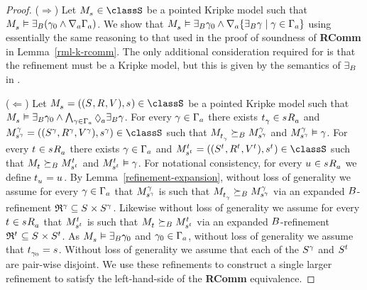 \begin{proof}
($\Rightarrow$)
Let $\kPModel{\kStateS} \in \classS$ be a pointed Kripke model such that $\kPModel{\kStateS} \entails \somerefsBs (\gamma_0 \land \coversA \Gamma_\agentA)$.
We show that $\kPModel{\kStateS} \entails \somerefsBs \gamma_0 \land \coversA \{\somerefsBs \gamma \mid \gamma \in \Gamma_\agentA\}$ using essentially the same reasoning to that used in the proof of soundness of {\bf RComm} in Lemma~\ref{rml-k-rcomm}.
The only additional consideration required for \logicRmlS{} is that the refinement must be a \classS{} Kripke model, but this is given by the semantics of $\somerefsBs$ in \logicRmlS{}.

($\Leftarrow$)
Let $\kPModelAndTuple{\kStateS} \in \classS$ be a pointed Kripke model such that $\kPModel{\kStateS} \entails \somerefsBs \gamma_0 \land \bigwedge_{\gamma \in \Gamma_\agentA} \possibleA \somerefsBs \gamma$.
For every $\gamma \in \Gamma_\agentA$ there exists $\kStateT_\gamma \in \kSuccessorsA{\kStateS}$ and $\kPModelAndTuple[\gamma]{\kStateS[\gamma]} \in \classS$ such that $\kPModel{\kStateT_\gamma} \simulatesBs \kPModel[\gamma]{\kStateS[\gamma]}$ and $\kPModel[\gamma]{\kStateS[\gamma]} \entails \gamma$.
For every $\kStateT \in \kSuccessorsA{\kStateS}$ there exists $\gamma \in \Gamma_\agentA$ and $\kPModelAndTuple[\kStateT]{\kStateS[\kStateT]} \in \classS$ such that $\kPModel{\kStateT} \simulatesBs \kPModel[\kStateT]{\kStateS[\kStateT]}$ and $\kPModel[\kStateT]{\kStateS[\kStateT]} \entails \gamma$.
For notational consistency, for every $\kStateU \in \kSuccessorsA{\kStateS}$ we define $\kStateT_{\kStateU} = \kStateU$.
By Lemma~\ref{refinement-expansion}, without loss of generality we assume for every $\gamma \in \Gamma_\agentA$ that $\kPModel[\gamma]{\kStateS[\gamma]}$ is such that $\kPModel{\kStateT_\gamma} \simulatesBs \kPModel[\gamma]{\kStateS[\gamma]}$ via an expanded $\agentsB$-refinement $\refinement^{\gamma} \subseteq \kStates \times \kStates[\gamma]$.
Likewise without loss of generality we assume for every $\kStateT \in \kSuccessorsA{\kStateS}$ that $\kPModel[\kStateT]{\kStateS[\kStateT]}$ is such that $\kPModel{\kStateT} \simulatesBs \kPModel[\kStateT]{\kStateS[\kStateT]}$ via an expanded $\agentsB$-refinement $\refinement^{\kStateT} \subseteq \kStates \times \kStates[\kStateT]$.
As $\kPModel{\kStateS} \entails \somerefsBs \gamma_0$ and $\gamma_0 \in \Gamma_\agentA$, without loss of generality we assume that $\kStateT_{\gamma_0} = \kStateS$.
Without loss of generality we assume that each of the $\kStates[\gamma]$ and $\kStates[\kStateT]$ are pair-wise disjoint.
We use these refinements to construct a single larger refinement to satisfy the left-hand-side of the {\bf RComm} equivalence.


\end{proof}
